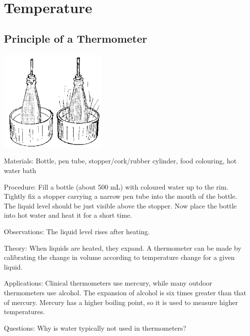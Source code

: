 \section{Temperature}

\begin{multicols}{2}


\subsection{Principle of a Thermometer}

\begin{center}
\includegraphics[width=0.4\textwidth]{./img/source/thermometer.png}
\end{center}

\begin{description*}
\item[Materials:]{Bottle, pen tube, stopper/cork/rubber cylinder, food colouring, hot water bath}
\item[Procedure:]{Fill a bottle (about 500 mL) with coloured water up to the rim. Tightly fix a stopper carrying a narrow pen tube into the mouth of the bottle. The liquid level should be just visible above the stopper. Now place the bottle into hot water and heat it for a short time.}
\item[Observations:]{The liquid level rises after heating.}
\item[Theory:]{When liquids are heated, they expand. A thermometer can be made by calibrating the change in volume according to temperature change for a given liquid.}
\item[Applications:]{Clinical thermometers use mercury, while many outdoor thermometers use alcohol. The expansion of alcohol is six times greater than that of mercury. Mercury has a higher boiling point, so it is used to measure higher temperatures.}
\item[Questions:]{Why is water typically not used in thermometers?}
\end{description*}


\end{multicols}
